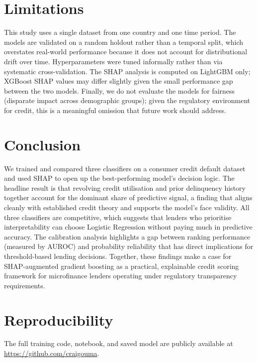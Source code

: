 \documentclass[11pt]{article}
\begin{document}
\section{Limitations}

This study uses a single dataset from one country and one time period. The
models are validated on a random holdout rather than a temporal split, which
overstates real-world performance because it does not account for
distributional drift over time. Hyperparameters were tuned informally
rather than via systematic cross-validation. The SHAP analysis is computed
on LightGBM only; XGBoost SHAP values may differ slightly given the small
performance gap between the two models. Finally, we do not evaluate the
models for fairness (disparate impact across demographic groups); given the
regulatory environment for credit, this is a meaningful omission that future
work should address.

\section{Conclusion}

We trained and compared three classifiers on a consumer credit default
dataset and used SHAP to open up the best-performing model's decision
logic. The headline result is that revolving credit utilisation and
prior delinquency history together account for the dominant share of
predictive signal, a finding that aligns cleanly with established credit
theory and supports the model's face validity. All three classifiers are
competitive, which suggests that lenders who prioritise interpretability
can choose Logistic Regression without paying much in predictive accuracy.
The calibration analysis highlights a gap between ranking performance
(measured by AUROC) and probability reliability that has direct
implications for threshold-based lending decisions. Together, these
findings make a case for SHAP-augmented gradient boosting as a
practical, explainable credit scoring framework for microfinance lenders
operating under regulatory transparency requirements.

\section*{Reproducibility}
The full training code, notebook, and saved model are publicly available
at \url{https://github.com/craigouma}.
\end{document}
